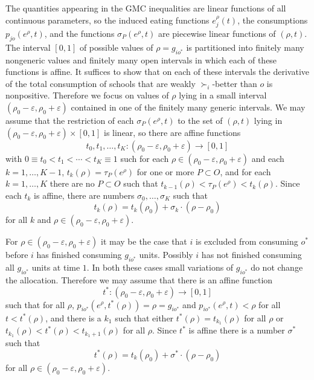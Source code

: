 \documentclass[12pt]{article}
\theoremstyle{definition}
\newcommand{\varep}{\varepsilon}
\begin{document}
\begin{appendix}
The quantities appearing in the GMC inequalities are linear functions of all continuous parameters, so the induced eating functions $e^\rho_j(t)$, the consumptions $p_{jo}(e^\rho,t)$, and the functions $\sigma_P(e^\rho,t)$ are piecewise linear functions of $(\rho,t)$.  The interval $[0,1]$ of possible values of $\rho = g_{io^*}$ is partitioned into finitely many nongeneric values and finitely many open intervals in which each of these functions is affine.
It suffices to show that on each of these intervals the derivative of the total consumption of schools that are weakly $\succ_i$-better than $o$ is nonpositive.  Therefore we focus  on values of $\rho$ lying in a small interval $(\rho_0 - \varep,\rho_0 + \varep)$ contained in one of the finitely many generic intervals.  We may assume that the restriction of each $\sigma_P(e^\rho,t)$ to the set of $(\rho,t)$ lying in $(\rho_0 - \varep,\rho_0 + \varep) \times [0,1]$ is linear, so there are affine functions $$t_0, t_1, \ldots, t_K \colon (\rho_0 - \varep,\rho_0 + \varep) \to [0,1]$$ with $0 \equiv t_0 < t_1 < \cdots < t_K \equiv 1$ such for each $\rho \in (\rho_0 - \varep,\rho_0 + \varep)$ and each $k = 1, \ldots, K-1$, $t_k(\rho) = \tau_P(e^\rho)$ for one or more $P \subset O$,  and for each $k = 1, \ldots, K$ there are no $P \subset O$ such that $t_{k-1}(\rho) < \tau_P(e^\rho) < t_k(\rho)$. Since each $t_k$ is affine, there are numbers $\sigma_0, \ldots, \sigma_K$ such that 
$$t_k(\rho) = t_k(\rho_0) + \sigma_k \cdot (\rho - \rho_0)$$ for all $k$ and $\rho \in (\rho_0 - \varep,\rho_0 + \varep)$.

For $\rho \in (\rho_0 - \varep,\rho_0 + \varep)$ it may be the case that $i$ is excluded from consuming $o^*$ before $i$ has finished consuming $g_{io^*}$ units.  Possibly $i$ has not finished consuming all $g_{io^*}$ units at time $1$.  In both these cases small variations of $g_{io^*}$ do not change the allocation. Therefore we may assume that there is an affine function $$t^* \colon (\rho_0 - \varep,\rho_0 + \varep) \to [0,1]$$ such that for all $\rho$, $p_{io^*}(e^\rho,t^*(\rho)) = \rho = g_{io^*}$ and $p_{io^*}(e^\rho,t) < \rho$ for all $t < t^*(\rho)$, and there is a $k_1$ such that either $t^*(\rho) = t_{k_1}(\rho)$ for all $\rho$ or $t_{k_1}(\rho) < t^*(\rho) < t_{k_1+1}(\rho)$ for all $\rho$.  Since $t^*$ is affine there is a number $\sigma^*$ such that 
$$t^*(\rho) = t_k(\rho_0) + \sigma^* \cdot (\rho - \rho_0)$$ for all $\rho \in (\rho_0 - \varep,\rho_0 + \varep)$.


\end{appendix}
\end{document}
